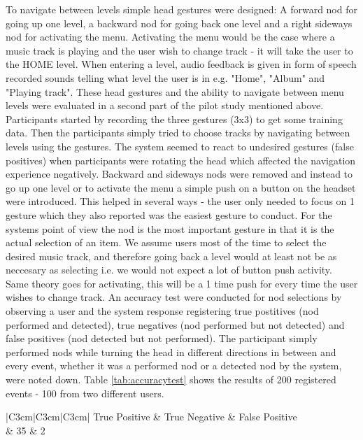 To navigate between levels simple head gestures were designed: A forward nod for going up one level, a backward nod for going back one level and a right sideways nod for activating the menu. Activating the menu would be the case where a music track is playing and the user wish to change track - it will take the user to the HOME level. When entering a level, audio feedback is given in form of speech recorded sounds telling what level the user is in e.g. "Home", "Album" and "Playing track". These head gestures and the ability to navigate between menu levels were evaluated in a second part of the pilot study mentioned above. Participants started by recording the three gestures (3x3) to get some training data. Then the participants simply tried to choose tracks by navigating between levels using the gestures. The system seemed to react to undesired gestures (false positives) when participants were rotating the head which affected the navigation experience negatively. Backward and sideways nods were removed and instead to go up one level or to activate the menu a simple push on a button on the headset were introduced. This helped in several ways - the user only needed to focus on 1 gesture which they also reported was the easiest gesture to conduct. For the systems point of view the nod is the most important gesture in that it is the actual selection of an item. We assume users most of the time to select the desired music track, and therefore going back a level would at least not be as neccesary as selecting i.e. we would not expect a lot of button push activity. Same theory goes for activating, this will be a 1 time push for every time the user wishes to change track. An accuracy test were conducted for nod selections by observing a user and the system response registering true postitives (nod performed and detected), true negatives (nod performed but not detected) and false positives (nod detected but not performed). The participant simply performed nods while turning the head in different directions in between and every event, whether it was a performed nod or a detected nod by the system, were noted down. Table \ref{tab:accuracytest} shows the results of 200 registered events - 100 from two different users.

\begin{table}[h] 
\scriptsize
\centering
\caption{Nod gesture accuracy test} %
\begin{tabular}{|C{3cm}|C{3cm}|C{3cm}|}
	\hline
	True Positive & True Negative & False Positive \\  & 35 & 2 \\ \hline
\end{tabular}
\label{tab:accuracytest} 
\end{table}

